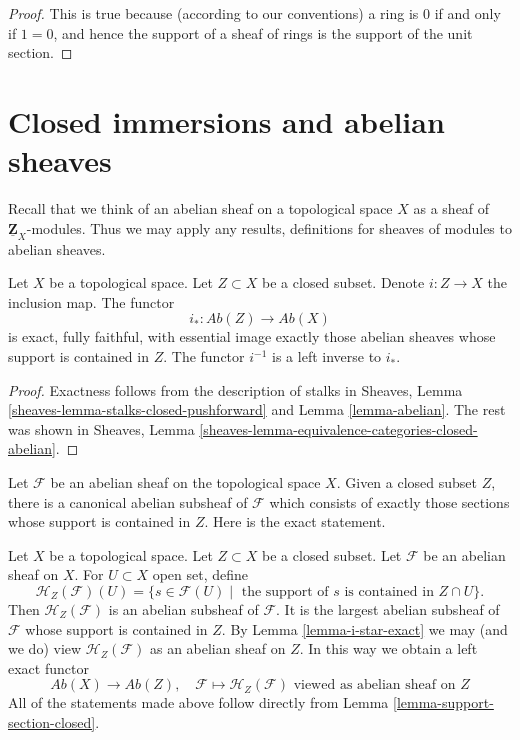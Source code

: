 \begin{proof}
This is true because (according to our conventions)
a ring is $0$ if and only if
$1 = 0$, and hence the support of a sheaf of rings
is the support of the unit section.
\end{proof}






\section{Closed immersions and abelian sheaves}
\label{section-closed-immersions}

\noindent
Recall that we think of an abelian sheaf on a topological space $X$ as a
sheaf of $\underline{\mathbf{Z}}_X$-modules. Thus we may apply any results,
definitions for sheaves of modules to abelian sheaves.

\begin{lemma}
\label{lemma-i-star-exact}
Let $X$ be a topological space. Let $Z \subset X$ be a closed subset.
Denote $i : Z \to X$ the inclusion map. The functor
$$
i_* : \textit{Ab}(Z) \longrightarrow \textit{Ab}(X)
$$
is exact, fully faithful, with essential image exactly those
abelian sheaves whose support is contained in $Z$. The functor $i^{-1}$
is a left inverse to $i_*$.
\end{lemma}

\begin{proof}
Exactness follows from the description of
stalks in Sheaves, Lemma \ref{sheaves-lemma-stalks-closed-pushforward}
and Lemma \ref{lemma-abelian}. The rest was shown in
Sheaves, Lemma \ref{sheaves-lemma-equivalence-categories-closed-abelian}.
\end{proof}

\noindent
Let $\mathcal{F}$ be an abelian sheaf on the topological space $X$. Given
a closed subset $Z$, there is a canonical abelian subsheaf of $\mathcal{F}$
which consists of exactly those sections whose support is contained in $Z$.
Here is the exact statement.

\begin{remark}
\label{remark-sections-support-in-closed}
Let $X$ be a topological space. Let $Z \subset X$ be a closed subset.
Let $\mathcal{F}$ be an abelian sheaf on $X$. For $U \subset X$ open set, define
$$
\mathcal{H}_Z(\mathcal{F})(U) =
\{s \in \mathcal{F}(U) \mid
\text{ the support of }s\text{ is contained in }Z \cap U\}.
$$
Then $\mathcal{H}_Z(\mathcal{F})$ is an abelian subsheaf of $\mathcal{F}$.
It is the largest abelian subsheaf of $\mathcal{F}$ whose support is
contained in $Z$. By Lemma \ref{lemma-i-star-exact} we may (and we do)
view $\mathcal{H}_Z(\mathcal{F})$ as an abelian sheaf on $Z$.
In this way we obtain a left exact functor
$$
\textit{Ab}(X) \longrightarrow \textit{Ab}(Z),\quad
\mathcal{F} \longmapsto \mathcal{H}_Z(\mathcal{F})
\text{ viewed as abelian sheaf on }Z
$$
All of the statements made above follow directly from
Lemma \ref{lemma-support-section-closed}.
\end{remark}

